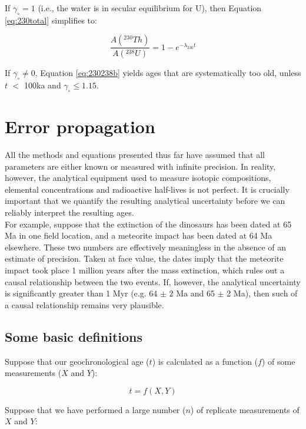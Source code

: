 \documentclass{book}
\begin{document}
If $\gamma_\circ = 1$ (i.e., the water is in secular equilibrium for
U), then Equation \ref{eq:230total} simplifies to:

\begin{equation}
\frac{A(^{230}Th)}{A(^{238}U)} = 1-e^{-\lambda_{230}t}
\label{eq:230238b}
\end{equation}

If $\gamma_\circ \neq 0$, Equation \ref{eq:230238b} yields ages that
are systematically too old, unless $t$ $<$ 100ka and $\gamma_\circ \leq
1.15$.

\chapter{Error propagation}
\label{sec:error-propagation}

All the methods and equations presented thus far have assumed that all
parameters are either known or measured with infinite precision. In
reality, however, the analytical equipment used to measure isotopic
compositions, elemental concentrations and radioactive half-lives is
not perfect.  It is crucially important that we quantify the resulting
analytical uncertainty before we can reliably interpret the resulting
ages.\\

For example, suppose that the extinction of the dinosaurs has been
dated at 65 Ma in one field location, and a meteorite impact has been
dated at 64 Ma elsewhere.  These two numbers are effectively
meaningless in the absence of an estimate of precision. Taken at face
value, the dates imply that the meteorite impact took place 1 million
years after the mass extinction, which rules out a causal relationship
between the two events. If, however, the analytical uncertainty is
significantly greater than 1 Myr (e.g. 64 $\pm$ 2 Ma and 65 $\pm$ 2
Ma), then such of a causal relationship remains very plausible.

\section{Some basic definitions}

Suppose that our geochronological age ($t$) is calculated as a function
($f$) of some measurements ($X$ and $Y$):

\begin{equation}
t = f(X,Y)
\label{eq:tfXY}
\end{equation}

Suppose that we have performed a large number ($n$) of replicate
measurements of $X$ and $Y$:
\end{document}
